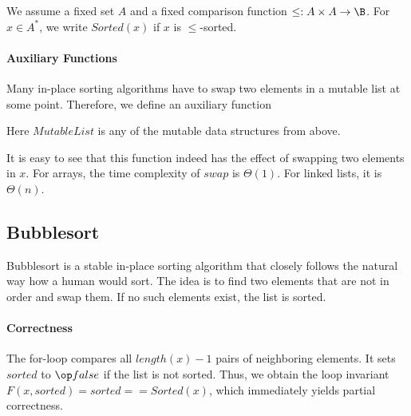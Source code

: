 We assume a fixed set $A$ and a fixed comparison function $\leq:A\times A \to \B$.
For $x\in A^*$, we write $Sorted(x)$ if $x$ is $\leq$-sorted.

\paragraph{Auxiliary Functions}
Many in-place sorting algorithms have to swap two elements in a mutable list at some point.
Therefore, we define an auxiliary function

\begin{acode}
\end{acode}
Here $MutableList$ is any of the mutable data structures from above.

It is easy to see that this function indeed has the effect of swapping two elements in $x$.
For arrays, the time complexity of $swap$ is $\Theta(1)$.
For linked lists, it is $\Theta(n)$.


\subsection{Bubblesort}\label{sec:ad:sort:bubble}

Bubblesort is a stable in-place sorting algorithm that closely follows the natural way how a human would sort.
The idea is to find two elements that are not in order and swap them.
If no such elements exist, the list is sorted.

\begin{acode}
\end{acode}

\paragraph{Correctness}
The for-loop compares all $length(x)-1$ pairs of neighboring elements.
It sets $sorted$ to $\false$ if the list is not sorted.
Thus, we obtain the loop invariant $F(x,sorted)=sorted==Sorted(x)$, which immediately yields partial correctness.

